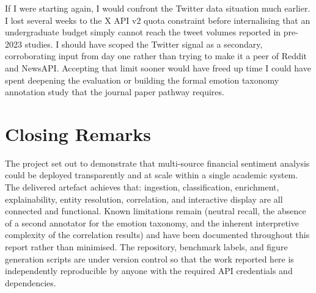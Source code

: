 If I were starting again, I would confront the Twitter data situation much earlier. I lost several weeks to the X API v2 quota constraint before internalising that an undergraduate budget simply cannot reach the tweet volumes reported in pre-2023 studies. I should have scoped the Twitter signal as a secondary, corroborating input from day one rather than trying to make it a peer of Reddit and NewsAPI. Accepting that limit sooner would have freed up time I could have spent deepening the evaluation or building the formal emotion taxonomy annotation study that the journal paper pathway requires.

\section{Closing Remarks}

The project set out to demonstrate that multi-source financial sentiment analysis could be deployed transparently and at scale within a single academic system. The delivered artefact achieves that: ingestion, classification, enrichment, explainability, entity resolution, correlation, and interactive display are all connected and functional. Known limitations remain (neutral recall, the absence of a second annotator for the emotion taxonomy, and the inherent interpretive complexity of the correlation results) and have been documented throughout this report rather than minimised. The repository, benchmark labels, and figure generation scripts are under version control so that the work reported here is independently reproducible by anyone with the required API credentials and dependencies.
